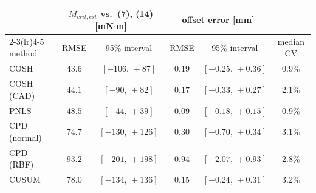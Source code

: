 \begin{tabular}{l cc cc c}
\toprule
 & \multicolumn{2}{c}{$M_{crit,est}$ vs.\ (7), (14) [mN$\cdot$m]} & \multicolumn{2}{c}{offset error [mm]} & \\
\cmidrule(lr){2-3}\cmidrule(lr){4-5}
method & RMSE & 95\% interval & RMSE & 95\% interval & median CV \\
\midrule
COSH & $43.6$ & $[-106,\,+87]$ & $0.19$ & $[-0.25,\,+0.36]$ & 0.9\% \\
COSH (CAD) & $44.1$ & $[-90,\,+82]$ & $0.17$ & $[-0.33,\,+0.27]$ & 2.1\% \\
PNLS & $48.5$ & $[-44,\,+39]$ & $0.09$ & $[-0.18,\,+0.15]$ & 0.9\% \\
CPD (normal) & $74.7$ & $[-130,\,+126]$ & $0.30$ & $[-0.70,\,+0.34]$ & 3.1\% \\
CPD (RBF) & $93.2$ & $[-201,\,+198]$ & $0.94$ & $[-2.07,\,+0.93]$ & 2.8\% \\
CUSUM & $78.0$ & $[-134,\,+136]$ & $0.15$ & $[-0.24,\,+0.31]$ & 3.2\% \\
\bottomrule
\end{tabular}
